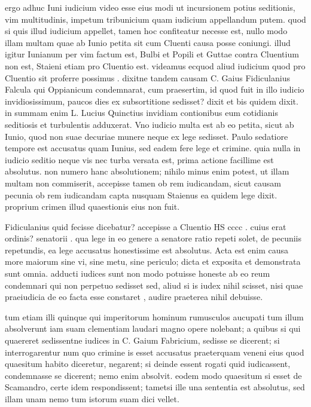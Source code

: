  ergo adhuc Iuni iudicium video esse eius modi ut incursionem potius seditionis, vim multitudinis, impetum tribunicium quam iudicium appellandum putem. quod si quis illud iudicium appellet, tamen hoc confiteatur necesse est, nullo modo illam multam quae ab Iunio petita sit cum Cluenti causa posse coniungi. illud igitur Iunianum per vim factum est, Bulbi et Popili et Guttae contra Cluentium non est, Staieni etiam pro Cluentio est. videamus ecquod aliud iudicium quod pro Cluentio sit proferre possimus . dixitne tandem causam C. Gaius Fidiculanius Falcula qui Oppianicum condemnarat, cum praesertim, id quod fuit in illo iudicio invidiosissimum, paucos dies ex subsortitione sedisset? dixit et bis quidem dixit. in summam enim L. Lucius Quinctius invidiam contionibus eum cotidianis seditiosis et turbulentis adduxerat. Vno iudicio multa est ab eo petita, sicut ab Iunio, quod non suae decuriae munere neque ex lege sedisset. Paulo sedatiore tempore est accusatus quam Iunius, sed eadem fere lege et crimine. quia nulla in iudicio seditio neque vis nec turba versata est, prima actione facillime est absolutus. non numero hanc absolutionem; nihilo minus enim potest, ut illam multam non commiserit, accepisse tamen ob rem iudicandam, sicut causam pecunia ob rem iudicandam capta nusquam Staienus ea quidem lege dixit. proprium crimen illud quaestionis eius non fuit.

 Fidiculanius quid fecisse dicebatur? accepisse a Cluentio HS cccc . cuius erat ordinis? senatorii . qua lege in eo genere a senatore ratio repeti solet, de pecuniis repetundis, ea lege accusatus honestissime est absolutus. Acta est enim causa more maiorum sine vi, sine metu, sine periculo; dicta et exposita et demonstrata sunt omnia. adducti iudices sunt non modo potuisse honeste ab eo reum condemnari qui non perpetuo sedisset sed, aliud si is iudex nihil scisset, nisi quae praeiudicia de eo facta esse constaret , audire praeterea nihil debuisse.

 tum etiam illi quinque qui imperitorum hominum rumusculos aucupati tum illum absolverunt iam suam clementiam laudari magno opere nolebant; a quibus si qui quaereret sedissentne iudices in C. Gaium Fabricium, sedisse se dicerent; si interrogarentur num quo crimine is esset accusatus praeterquam veneni eius quod quaesitum habito diceretur, negarent; si deinde essent rogati quid iudicassent, condemnasse se dicerent; nemo enim absolvit. eodem modo quaesitum si esset de Scamandro, certe idem respondissent; tametsi ille una sententia est absolutus, sed illam unam nemo tum istorum suam dici vellet.

